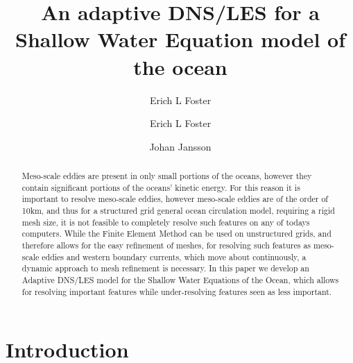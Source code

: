 \documentclass{elsarticle}
\author{Erich L Foster}
\begin{document}
  \begin{frontmatter}
    \author[1]{Erich L Foster}

    \author[1]{Johan Jansson}

    \address[1]{Basque Center for Applied Mathematics, Alameda Mazarredo, 14,
      48009 Bilbao, Basque Country -- Spain}

    \title{An adaptive DNS/LES for a Shallow Water Equation model of the ocean}

    \begin{abstract}
      Meso-scale eddies are present in only small portions of the oceans,
      however they contain significant portions of the oceans' kinetic energy.
      For this reason it is important to resolve meso-scale eddies, however
      meso-scale eddies are of the order of 10km, and thus for a structured grid
      general ocean circulation model, requiring a rigid mesh size, it is not
      feasible to completely resolve such features on any of todays computers.
      While the Finite Element Method can be used on unstructured grids, and
      therefore allows for the easy refinement of meshes, for resolving such
      features as meso-scale eddies and western boundary currents, which move
      about continuously, a dynamic approach to mesh refinement is necessary. In
      this paper we develop an Adaptive DNS/LES model for the Shallow Water
      Equations of the Ocean, which allows for resolving important features
      while under-resolving features seen as less important.
    \end{abstract}
  \end{frontmatter}

  \section{Introduction} \label{sec:Intro}
  

  
  
\end{document}
